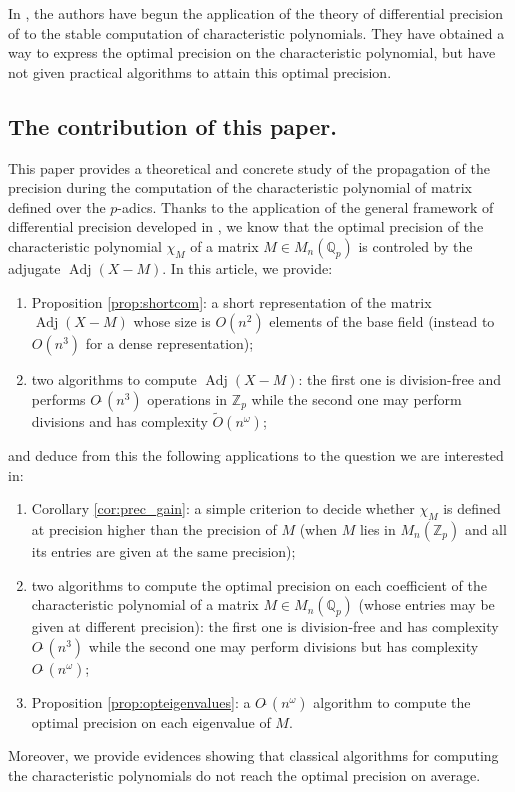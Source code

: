 \documentclass{sig-alternate-05-2015}
\DeclareMathOperator{\adj}{Adj}
\newcommand{\Z}{\mathbb Z}
\newcommand{\Zp}{\Z_p}
\newcommand{\Q}{\mathbb Q}
\newcommand{\Qp}{\Q_p}
\newcommand{\softO}{O\tilde{~}}
\begin{document}
In \cite{caruso-roe-vaccon:15a}, the authors have begun the application
of the theory of differential precision of \cite{caruso-roe-vaccon:14a}
to the stable computation of characteristic polynomials.
They have obtained a way to express the optimal precision
on the characteristic polynomial, but have not given practical algorithms
to attain this optimal precision.

\subsection*{The contribution of this paper.}

This paper provides a theoretical and concrete study of the propagation 
of the precision during the computation of the characteristic polynomial 
of matrix defined over the $p$-adics. Thanks to the application of the 
general framework of differential precision developed in 
\cite{caruso-roe-vaccon:14a,caruso-roe-vaccon:15a}, we know that the 
optimal precision of the characteristic polynomial $\chi_M$ of a matrix 
$M \in M_n(\mathbb{Q}_p)$ is controled by the adjugate $\adj(X{-}M).$
In this article, we provide:
\begin{enumerate}
\renewcommand{\itemsep}{0pt}
\item Proposition \ref{prop:shortcom}: a short representation of
the matrix $\adj(X{-}M)$ whose size is $O(n^2)$ elements of the base
field (instead to $O(n^3)$ for a dense representation);
\item two algorithms to compute $\adj(X{-}M)$: the first one is 
division-free and performs $\softO(n^3)$ operations in $\Zp$ while 
the second one may perform divisions and has complexity $\tilde 
O(n^\omega)$;
\end{enumerate}
and deduce from this the following applications to the question
we are interested in:
\begin{enumerate}
\renewcommand{\itemsep}{0pt}
\setcounter{enumi}{2}
\item Corollary \ref{cor:prec_gain}: a simple criterion to decide 
whether $\chi_M$ is defined at precision higher than the precision of 
$M$ (when $M$ lies in $M_n(\mathbb{Z}_p)$ and all its entries are given 
at the same precision);
\item two algorithms to compute the optimal precision on each 
coefficient of the characteristic polynomial of a matrix $M \in 
M_n(\Qp)$ (whose entries may be given at different precision): the first 
one is division-free and has complexity $\softO(n^3)$ while the second 
one may perform divisions but has complexity $\softO(n^\omega)$;
\item Proposition \ref{prop:opteigenvalues}: a $\softO(n^\omega)$
algorithm to compute the optimal precision on each eigenvalue of $M$.
\end{enumerate}
Moreover, we provide evidences showing that classical algorithms for 
computing the characteristic polynomials do not reach the optimal 
precision on average.
\end{document}
